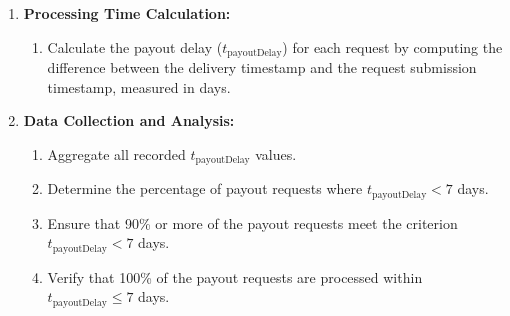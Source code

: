 \documentclass[12pt, titlepage]{article}
\begin{document}
\begin{enumerate}
\begin{enumerate}
    \item \textbf{Processing Time Calculation:}
    \begin{enumerate}
        \item Calculate the payout delay ($t_{\text{payoutDelay}}$) for each request by computing the difference between the delivery timestamp and the request submission timestamp, measured in days.
    \end{enumerate}
    
    \item \textbf{Data Collection and Analysis:}
    \begin{enumerate}
        \item Aggregate all recorded $t_{\text{payoutDelay}}$ values.
        \item Determine the percentage of payout requests where $t_{\text{payoutDelay}} < 7$ days.
        \item Ensure that 90\% or more of the payout requests meet the criterion $t_{\text{payoutDelay}} < 7$ days.
        \item Verify that 100\% of the payout requests are processed within $t_{\text{payoutDelay}} \leq 7$ days.
    \end{enumerate}
    
\end{enumerate}

\end{enumerate}

\end{document}
